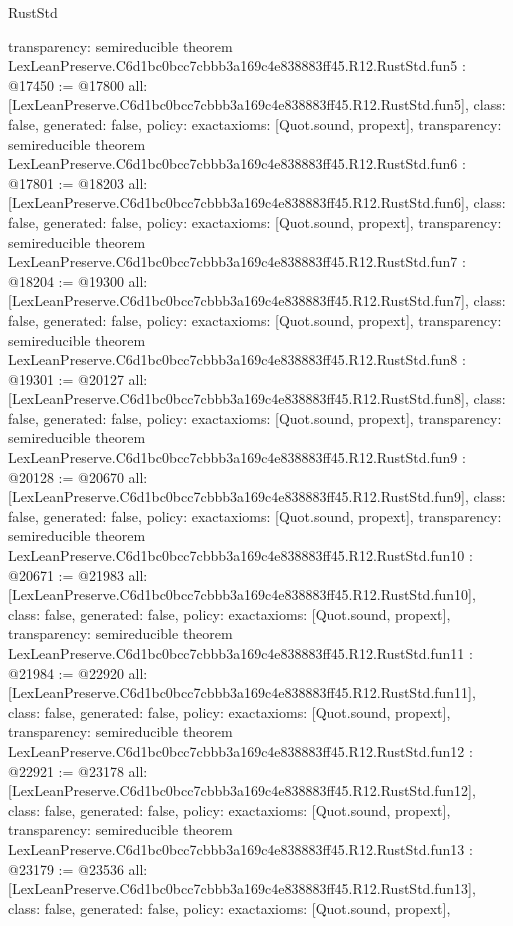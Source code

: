 \begin{lexlean}{RustStd}
\begin{coremodule}
{  transparency: semireducible
}
theorem LexLeanPreserve.C6d1bc0bcc7cbbb3a169c4e838883ff45.R12.RustStd.fun5 : @17450 := @17800 {
  all: [LexLeanPreserve.C6d1bc0bcc7cbbb3a169c4e838883ff45.R12.RustStd.fun5],
  class: false,
  generated: false,
  policy: exact{axioms: [Quot.sound, propext]},
  transparency: semireducible
}
theorem LexLeanPreserve.C6d1bc0bcc7cbbb3a169c4e838883ff45.R12.RustStd.fun6 : @17801 := @18203 {
  all: [LexLeanPreserve.C6d1bc0bcc7cbbb3a169c4e838883ff45.R12.RustStd.fun6],
  class: false,
  generated: false,
  policy: exact{axioms: [Quot.sound, propext]},
  transparency: semireducible
}
theorem LexLeanPreserve.C6d1bc0bcc7cbbb3a169c4e838883ff45.R12.RustStd.fun7 : @18204 := @19300 {
  all: [LexLeanPreserve.C6d1bc0bcc7cbbb3a169c4e838883ff45.R12.RustStd.fun7],
  class: false,
  generated: false,
  policy: exact{axioms: [Quot.sound, propext]},
  transparency: semireducible
}
theorem LexLeanPreserve.C6d1bc0bcc7cbbb3a169c4e838883ff45.R12.RustStd.fun8 : @19301 := @20127 {
  all: [LexLeanPreserve.C6d1bc0bcc7cbbb3a169c4e838883ff45.R12.RustStd.fun8],
  class: false,
  generated: false,
  policy: exact{axioms: [Quot.sound, propext]},
  transparency: semireducible
}
theorem LexLeanPreserve.C6d1bc0bcc7cbbb3a169c4e838883ff45.R12.RustStd.fun9 : @20128 := @20670 {
  all: [LexLeanPreserve.C6d1bc0bcc7cbbb3a169c4e838883ff45.R12.RustStd.fun9],
  class: false,
  generated: false,
  policy: exact{axioms: [Quot.sound, propext]},
  transparency: semireducible
}
theorem LexLeanPreserve.C6d1bc0bcc7cbbb3a169c4e838883ff45.R12.RustStd.fun10 : @20671 := @21983 {
  all: [LexLeanPreserve.C6d1bc0bcc7cbbb3a169c4e838883ff45.R12.RustStd.fun10],
  class: false,
  generated: false,
  policy: exact{axioms: [Quot.sound, propext]},
  transparency: semireducible
}
theorem LexLeanPreserve.C6d1bc0bcc7cbbb3a169c4e838883ff45.R12.RustStd.fun11 : @21984 := @22920 {
  all: [LexLeanPreserve.C6d1bc0bcc7cbbb3a169c4e838883ff45.R12.RustStd.fun11],
  class: false,
  generated: false,
  policy: exact{axioms: [Quot.sound, propext]},
  transparency: semireducible
}
theorem LexLeanPreserve.C6d1bc0bcc7cbbb3a169c4e838883ff45.R12.RustStd.fun12 : @22921 := @23178 {
  all: [LexLeanPreserve.C6d1bc0bcc7cbbb3a169c4e838883ff45.R12.RustStd.fun12],
  class: false,
  generated: false,
  policy: exact{axioms: [Quot.sound, propext]},
  transparency: semireducible
}
theorem LexLeanPreserve.C6d1bc0bcc7cbbb3a169c4e838883ff45.R12.RustStd.fun13 : @23179 := @23536 {
  all: [LexLeanPreserve.C6d1bc0bcc7cbbb3a169c4e838883ff45.R12.RustStd.fun13],
  class: false,
  generated: false,
  policy: exact{axioms: [Quot.sound, propext]},
}
\end{coremodule}
\end{lexlean}
